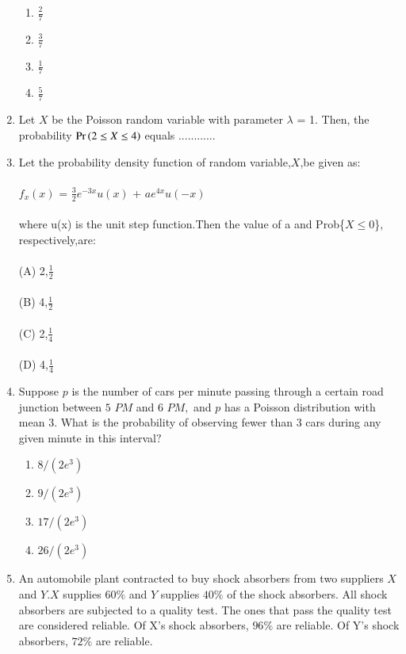\documentclass[journal,12pt,twocolumn]{IEEEtran}
\begin{document}
\begin{enumerate}
\begin{enumerate}
    \item  $\frac{2}{7}$ 
    \item  $\frac{3}{7}$ 
    \item  $\frac{1}{7}$ 
    \item  $\frac{5}{7}$ 
\end{enumerate}
%
\solution

%
\item Let $X$ be the Poisson random variable with parameter $\lambda$ = 1. Then, the probability 
$\Pr\left(2 \leq X \leq 4\right)$ equals ............
%
\\
\solution

%
\item Let the probability density function of random variable,$X$,be given as:\\
\\$f_x(x)$ = $\frac{3}{2}$$e^{-3x}$${u(x)}$ + $a$$e^{4x}$${u(-x)}$\\
\\where u(x) is the unit step function.Then the value of a and Prob\{$X\leq0$\}, respectively,are:\\
\\(A) 2,$\frac{1}{2}$\\
\\(B) 4,$\frac{1}{2}$\\
\\(C) 2,$\frac{1}{4}$\\
\\(D) 4,$\frac{1}{4}$\\
\solution

%
\item  Suppose $p$ is the number of cars per minute passing through a certain road junction between $5$ $PM$ and $6$ $PM,$ and $p$ has a Poisson distribution with mean $3$. What is the probability of observing fewer than $3$ cars during any given minute in this interval$?$
\begin{enumerate}
    \item $8/(2e^3)$
    \item $9/(2e^3)$
    \item $17/(2e^3)$
    \item $26/(2e^3)$
\end{enumerate}
\solution

%
\item An automobile plant contracted to buy shock absorbers from two suppliers $X$ and $Y . X$ supplies $60 \%$ and $Y$ supplies $40 \%$ of the shock absorbers. All shock absorbers are subjected to a quality test. The ones that pass the quality test are considered reliable. Of X's shock absorbers, $96 \%$ are reliable. Of Y's shock absorbers, $72 \%$ are reliable.

\end{enumerate}
\end{document}

